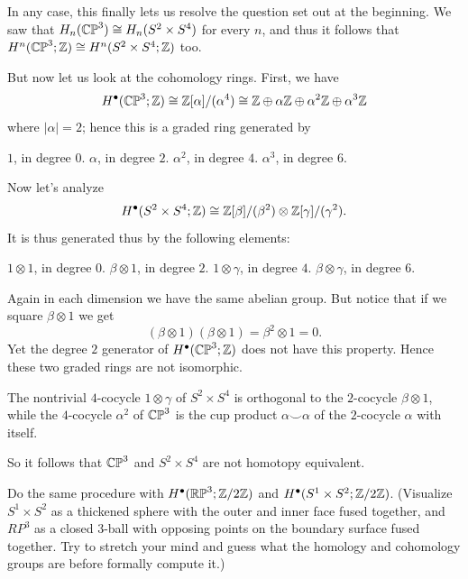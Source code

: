 In any case, this finally lets us resolve the question
set out at the beginning.
We saw that $H_n(\mathbb{CP}^3) \cong H_n(S^2 \times S^4)$ for every $n$,
and thus it follows that $H^n(\mathbb{CP}^3; \mathbb Z) \cong H^n(S^2 \times S^4; \mathbb Z)$ too.

But now let us look at the cohomology rings. First, we have
\[ H^\bullet(\mathbb{CP}^3; \mathbb Z) \cong \mathbb Z[\alpha] / (\alpha^4)
	\cong \mathbb Z \oplus \alpha\mathbb Z \oplus \alpha^2\mathbb Z \oplus \alpha^3\mathbb Z
\]
where $|\alpha| = 2$; hence this is a graded ring generated by
\begin{itemize}
	\ii $1$, in degree $0$.
	\ii $\alpha$, in degree $2$.
	\ii $\alpha^2$, in degree $4$.
	\ii $\alpha^3$, in degree $6$.
\end{itemize}

Now let's analyze
\[ H^\bullet(S^2 \times S^4; \mathbb Z) \cong
	\mathbb Z[\beta] / (\beta^2)
	\otimes
	\mathbb Z[\gamma] / (\gamma^2).
\]
It is thus generated thus by the following elements:
\begin{itemize}
	\ii $1 \otimes 1$, in degree $0$.
	\ii $\beta \otimes 1$, in degree $2$.
	\ii $1 \otimes \gamma$, in degree $4$.
	\ii $\beta \otimes \gamma$, in degree $6$.
\end{itemize}
Again in each dimension we have the same abelian group.
But notice that if we square $\beta \otimes 1$ we get
\[ (\beta \otimes 1)(\beta \otimes 1) = \beta^2 \otimes 1 = 0. \]
Yet the degree $2$ generator of $H^\bullet(\mathbb{CP}^3; \mathbb Z)$
does not have this property.
Hence these two graded rings are not isomorphic.

\begin{moral}
	The nontrivial $4$-cocycle $1 \otimes \gamma$ of $S^2 \times S^4$ is orthogonal to the
	$2$-cocycle $\beta \otimes 1$, while the $4$-cocycle $\alpha^2$ of $\mathbb{CP}^3$ is the cup product
	$\alpha \smile \alpha$ of the $2$-cocycle $\alpha$ with itself.
\end{moral}

So it follows that $\mathbb{CP}^3$ and $S^2 \times S^4$ are not homotopy equivalent.

\begin{exercise}
	Do the same procedure with $H^\bullet(\mathbb{RP}^3; \mathbb Z/2\mathbb Z)$ and $H^\bullet(S^1 \times S^2; \mathbb Z/2\mathbb Z)$.
	(Visualize $S^1 \times S^2$ as a thickened sphere with the outer and inner face fused together,
	and $RP^3$ as a closed $3$-ball with opposing points on the boundary surface fused together.
	Try to stretch your mind and guess what the homology and cohomology groups are before formally
	compute it.)
\end{exercise}

